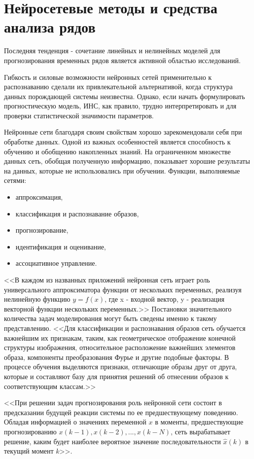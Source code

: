 \section{Нейросетевые методы и средства анализа рядов}
Последняя тенденция - сочетание линейных и нелинейных моделей для прогнозирования временных рядов является активной областью исследований. 

Гибкость и силовые возможности нейронных сетей  применительно к распознаванию сделали их привлекательной альтернативой, когда структура данных порождающей системы неизвестна. Однако, если начать формулировать прогностическую модель, ИНС, как правило, трудно интерпретировать и для проверки статистической значимости параметров.

Нейронные сети благодаря своим свойствам хорошо зарекомендовали себя при обработке данных. Одной из важных особенностей является способность к обучению и обобщению накопленных знаний. На ограниченном множестве данных сеть, обобщая полученную информацию, показывает хорошие результаты на данных, которые не использовались при обучении.
Функции, выполняемые сетями:
\begin{itemize}
\item аппроксимация,
\item классификация и распознавание образов,
\item прогнозирование,
\item идентификация и оценивание,
\item ассоциативное управление.
\end{itemize}

<<В каждом из названных приложений нейронная сеть играет роль универсального аппроксиматора функции от нескольких переменных, реализуя нелинейную функцию $y=f(x)$, где x - входной вектор, y - реализация векторной функции нескольких переменных.>> Постановки значительного количества задач моделирования могут быть сведены именно к такому представлению.
<<Для классификации и распознавания образов сеть обучается важнейшим их признакам, таким, как геометрическое отображение конечной структуры изображения, относительное расположение важнейших элементов образа, компоненты преобразования Фурье и другие подобные факторы. В процессе обучения выделяются признаки, отличающие образы друг от друга, которые и составляют базу для принятия решений об отнесении образов к соответствующим классам.>> 

<<При решении задач прогнозирования роль нейронной сети состоит в предсказании будущей реакции системы по ее предшествующему поведению. Обладая информацией о значениях переменной $x$ в моменты, предшествующие прогнозированию $x(k-1), x(k-2), ..., x(k-N)$, сеть вырабатывает решение, каким будет наиболее вероятное значение последовательности $\widehat{x}(k)$ в текущий момент $k$>>.


